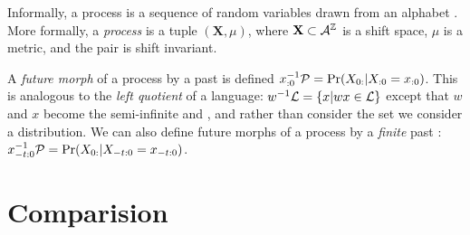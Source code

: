 \documentclass[prl,twocolumn,showpacs,superscriptaddress,preprintnumbers,floatfix]{revtex4-1}
\begin{document}
Informally, a process is a sequence of random variables drawn from an alphabet
\MeasAlphabet. More formally, a \emph{process} \Process is a tuple $(\mathbf{X},
\mu)$, where $\mathbf{X} \subset \mathcal{A}^\mathbb{Z}$ is a shift space,
$\mu$ is a metric, and the pair is shift invariant.

A \emph{future morph} of a process \Process by a past \past is defined
${x}_{:0}^{-1}\mathcal{P} = \Pr({X}_{0:} | {X}_{:0} = {x}_{:0})$. This is analogous to the
\emph{left quotient} of a language: $w^{-1}\mathcal{L} = \{ x | wx \in \mathcal{L}
\}$ except that $w$ and $x$ become the semi-infinite \past and \future, and
rather than consider the set we consider a distribution. We can also define
future morphs of a process by a \emph{finite} past :
${x}_{-t:0}^{-1}\mathcal{P} = \Pr({X}_{0:} | {X}_{-t:0} = {x}_{-t:0})$.

\section{Comparision}
\label{sec:comparison}
\end{document}
